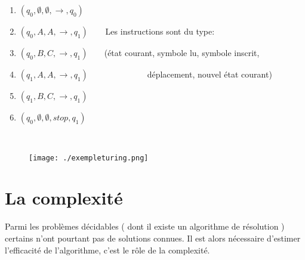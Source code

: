 \documentclass[12pt]{article}   %
\begin{document}
\begin{enumerate}
	\item \begin{math}(q_{0},\emptyset,\emptyset,\longrightarrow,q_{0})\end{math}
	\item \begin{math}(q_{0},A,A,\longrightarrow,q_{1})\end{math}  \begin{math}\;\;\;\;\;\end{math} Les instructions sont du type:
	\item \begin{math}(q_{0},B,C,\longrightarrow,q_{1})\end{math}\begin{math}\;\;\;\;\;\;\;\end{math}(état courant, symbole lu, symbole inscrit, 
	\item \begin{math}(q_{1},A,A,\longrightarrow,q_{1})\end{math}  \begin{math}\;\;\;\;\;\;\;\;\;\;\;\;\;\;\;\;\;\;\;\;\;\;\;\end{math} déplacement, nouvel état courant)
	\item \begin{math}(q_{1},B,C,\longrightarrow,q_{1})\end{math}
	\item \begin{math}(q_{0},\emptyset,\emptyset,stop,q_{1})\end{math}
\end{enumerate}
~\\\begin{figure}[htbp]
	\centering
		\texttt{[image: ./exempleturing.png]}
	\label{fig:exempleturing}
\end{figure}
\newpage
\section{La complexité}
Parmi les problèmes décidables ( dont il existe un algorithme de résolution ) certains n'ont pourtant pas de solutions connues. Il est alors nécessaire d'estimer l'efficacité de l'algorithme, c'est le rôle de la complexité.
\end{document}

